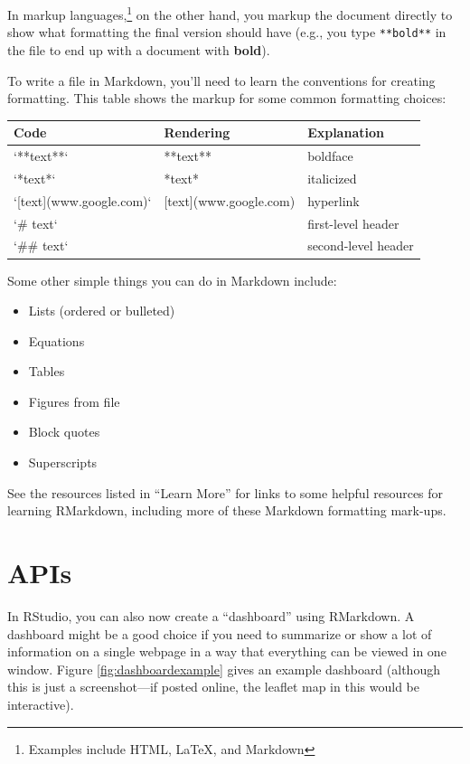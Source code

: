 \documentclass[]{tufte-book}
\providecommand{\tightlist}{%
  \setlength{\itemsep}{0pt}\setlength{\parskip}{0pt}}
\begin{document}
In markup languages,\footnote{Examples include HTML, LaTeX, and Markdown} on the other hand, you markup the
document directly to show what formatting the
final version should have (e.g., you type \texttt{**bold**} in the file to end up with a document with
\textbf{bold}).

To write a file in Markdown, you'll need to learn the conventions for creating formatting. This table
shows the markup for some common formatting choices:

\begin{tabular}{l|l|l}
\hline
Code & Rendering & Explanation\\
\hline
`**text**` & **text** & boldface\\
\hline
`*text*` & *text* & italicized\\
\hline
`[text](www.google.com)` & [text](www.google.com) & hyperlink\\
\hline
`\# text` &  & first-level header\\
\hline
`\#\# text` &  & second-level header\\
\hline
\end{tabular}

Some other simple things you can do in Markdown include:

\begin{itemize}
\tightlist
\item
  Lists (ordered or bulleted)
\item
  Equations
\item
  Tables
\item
  Figures from file
\item
  Block quotes
\item
  Superscripts
\end{itemize}

See the resources listed in ``Learn More'' for links to some helpful resources for learning
RMarkdown, including more of these Markdown formatting mark-ups.

\hypertarget{apis}{%
\section{APIs}\label{apis}}

In RStudio, you can also now create a ``dashboard'' using RMarkdown. A dashboard might be
a good choice if you need to summarize or show a lot of information on a single webpage
in a way that everything can be viewed in one window. Figure \ref{fig:dashboardexample}
gives an example dashboard (although this is just a screenshot---if posted online, the
leaflet map in this
would be interactive).
\end{document}
